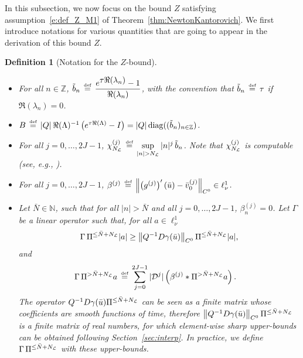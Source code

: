 \documentclass[10pt,a4paper]{article}
\theoremstyle{plain}
\newtheorem{definition}[theorem]{Definition}
\newcommand{\ZZ}{\mathbb Z}
\newcommand{\NN}{\mathbb N}
\renewcommand{\L}{\mathcal{L}}
\newcommand{\D}{\mathcal{D}}
\newcommand{\bu}{\bar{u}}
\newcommand{\bN}{\bar{N}}
\newcommand{\tb}{\tilde{b}}
\newcommand{\1}{\mathbf{1}}
\newcommand{\ds}{\displaystyle}
\newcommand{\bydef}{\,\stackrel{\mbox{\tiny\textnormal{\raisebox{0ex}[0ex][0ex]{def}}}}{=}\,}
\DeclareMathOperator{\diag}{diag}
\newcommand{\NL}{N_{\text{\tiny{$\L$}}}}
\begin{document}
In this subsection, we now focus on the bound $Z$ satisfying assumption~\eqref{e:def_Z_M1} of Theorem~\ref{thm:NewtonKantorovich}. We first introduce notations for various quantities that are going to appear in the derivation of this bound $Z$.
\begin{definition}[Notation for the $Z$-bound]
\label{def:notation_Z}
${}$
\begin{itemize}
\item For all $n\in\ZZ$, $\tb_n \bydef \dfrac{e^{\ds\tau \Re(\lambda_n)}-1}{\Re(\lambda_n)}$, with the convention that $\tb_n \bydef \tau$ if $\Re(\lambda_n) = 0$.
\item $B \bydef \vert Q\vert\, \Re(\Lambda)^{-1} \left(e^{\tau \Re(\Lambda)} - I\right) = \vert Q\vert \diag((\tb_n)_{n\in\ZZ})$. 
\item For all $j=0,\ldots,2J-1$, $\chi^{(j)}_{\NL} \bydef \sup\limits_{\vert n\vert >\NL} \vert n\vert^j\, \tilde{b}_n$. Note that $\chi^{(j)}_{\NL}$ is computable (see, e.g., \cite[Appendix D]{BerBreShe24}). 
\item For all $j=0,\ldots,2J-1$, $\beta^{(j)} \bydef \left\Vert\left(g^{(j)}\right)'(\bu) - \bar{v}_0^{(j)} \right\Vert_{C^0} \in \ell^1_\nu$.
\item Let $\bN\in\NN$, such that for all $\vert n\vert >\bN$ and all $j=0,\ldots,2J-1$, $\beta^{(j)}_n = 0$. Let $\Gamma$ be a linear operator such that, for all $a\in \ell^1_\nu$
\begin{align*}
\Gamma\, \Pi^{\leq \bN + \NL} \vert a\vert \geq \left\Vert Q^{-1} D\gamma(\bu) \right\Vert_{C^0} \Pi^{\leq \bN + \NL} \vert a\vert,
\end{align*}
and
\begin{align*}
\Gamma\, \Pi^{> \bN + \NL}a &\bydef  \sum_{j=0}^{2J-1} \vert \D^j\vert \left( \beta^{(j)} \ast \Pi^{> \bN +\NL} a \right).
\end{align*}
The operator $Q^{-1} D\gamma(\bu) \Pi^{\leq \bN + \NL}$ can be seen as a finite matrix whose coefficients are smooth functions of time, therefore $\left\Vert Q^{-1} D\gamma(\bu) \right\Vert_{C^0} \Pi^{\leq \bN + \NL}$ is a finite matrix of real numbers, for which element-wise sharp upper-bounds can be obtained following Section~\ref{sec:interp}. In practice,  we define $\Gamma\, \Pi^{\leq \bN + \NL}$ with these upper-bounds.
\end{itemize}
\end{definition}
\end{document}
